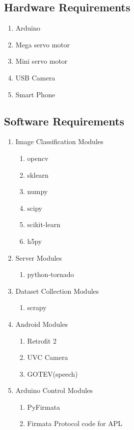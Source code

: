 \documentclass{fisatproject}
\begin{document}
\subsection{Hardware Requirements}
   \begin{enumerate}
       \item Arduino
       \item Mega servo motor
       \item Mini servo motor
       \item USB Camera
       \item Smart Phone
   \end{enumerate}
\subsection{Software Requirements}
   \begin{enumerate}
       \item Image Classification Modules
       \begin{enumerate}
            \item opencv
            \item sklearn
            \item numpy
            \item scipy
            \item scikit-learn
            \item h5py
        \end{enumerate}
       
       \item Server Modules
       \begin{enumerate}
           \item python-tornado
       \end{enumerate}
       
       \item Dataset Collection Modules
       \begin{enumerate}
           \item scrapy
       \end{enumerate}
       
       \item Android Modules
       \begin{enumerate}
            \item Retrofit 2
            \item UVC Camera
            \item GOTEV(speech)
       \end{enumerate}
       
       \item Arduino Control Modules
       \begin{enumerate}
            \item PyFirmata
            \item Firmata Protocol code for APL
       \end{enumerate}
    \end{enumerate}
\end{document}
